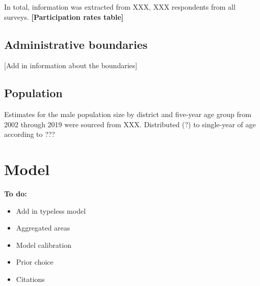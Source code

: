 \documentclass{article}
\begin{document}
\begin{appendix}
In total, information was extracted from XXX, XXX respondents from all surveys.
\textbf{[Participation rates table]}


\subsection{Administrative boundaries}
\label{sec:org0995c95}


[Add in information about the boundaries] 


\subsection{Population}
\label{sec:org0d7d6e9}


Estimates for the male population size by district and five-year age group from 2002 through 2019 were sourced from XXX. 
Distributed (?) to single-year of age according to ??? 


\section{Model}
\label{sec:org38d457a}


{\color{red} \bf
To do:
\begin{itemize}
    \item Add in typeless model
    \item Aggregated areas
    \item Model calibration
    \item Prior choice
    \item Citations
\end{itemize}}


\end{appendix}
\end{document}
